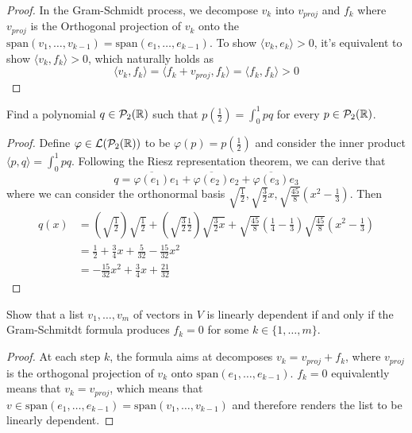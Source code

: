 \documentclass{extarticle}
\begin{document}
\begin{proof}

In the Gram-Schmidt process, we decompose \(v_k\) into \(v_{proj}\) and \(f_k\) where \(v_{proj}\) is 
the Orthogonal projection of \(v_k\) onto the \(\text{span}(v_1, \ldots, v_{k-1}) = \text{span}(e_1, \ldots, e_{k-1})\). 
To show \(\langle v_k,e_k \rangle > 0\), it's equivalent to show \(\langle v_k, f_k \rangle > 0\), which 
naturally holds as 
\[\langle v_k,f_k \rangle = \langle f_k + v_{proj},f_k \rangle = \langle f_k,f_k \rangle > 0\]
\end{proof}



\begin{problem}{11}
    Find a polynomial \(q \in \mathcal{P}_2(\mathbb{R})\) such that \(p(\frac{1}{2}) = \int_{0}^{1}pq \) for every 
    \(p \in \mathcal{P}_2(\mathbb{R})\).
\end{problem}

\begin{proof}
Define \(\varphi \in \mathcal{L}(\mathcal{P}_2(\mathbb{R}))\) to be \(\varphi(p) = p(\frac{1}{2})\) and consider the inner 
product \(\langle p,q \rangle = \int_{0}^{1} pq\). Following the Riesz representation theorem, we 
can derive that 
\[q =  \overline{\varphi(e_1)}e_1 + \overline{\varphi(e_2)}e_2 + \overline{\varphi(e_3)}e_3\]
where we can consider the orthonormal basis \(\sqrt{\frac{1}{2}}, \sqrt{\frac{3}{2}}x, 
\sqrt{\frac{45}{8}}(x^2 - \frac{1}{3})\). Then 
\begin{align*}
    q(x) &= (\sqrt{\frac{1}{2}})\sqrt{\frac{1}{2}}  + (\sqrt{\frac{3}{2}} \frac{1}{2}) \sqrt{\frac{3}{2}x}
    + \sqrt{\frac{45}{8}}(\frac{1}{4} - \frac{1}{3}) \sqrt{\frac{45}{8}}(x^2 - \frac{1}{3}) \\ 
    &= \frac{1}{2} + \frac{3}{4}x + \frac{5}{32} - \frac{15}{32}x^2 \\ 
    &= -\frac{15}{32}x^2 + \frac{3}{4}x + \frac{21}{32} 
\end{align*}

\end{proof}

\begin{problem}{13}
    Show that a list \(v_1, \ldots, v_m\) of vectors in \(V\) is linearly dependent if and only if 
    the Gram-Schmitdt formula produces \(f_k = 0\) for some \(k \in \{1, \ldots, m\}\).
\end{problem}

\begin{proof}
At each step \(k\), the formula aims at decomposes \(v_k = v_{proj} + f_k\), where \(v_{proj}\) is the 
orthogonal projection of \(v_k\) onto \(\text{span}(e_1, \ldots, e_{k-1})\). \(f_k = 0\) equivalently 
means that \(v_k = v_{proj}\), which means that \(v \in \text{span}(e_1, \ldots, e_{k-1}) 
= \text{span}(v_1, \ldots, v_{k-1})\) and therefore renders the list to be linearly dependent. 
\end{proof}
\end{document}
